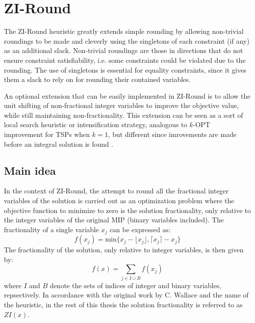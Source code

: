 \documentclass[a4paper,12pt,twoside]{scrbook}
\begin{document}
\section{ZI-Round} \label{sec:ziround}
The ZI-Round heuristic greatly extends simple rounding by allowing non-trivial roundings to be made and cleverly using the singletons of each constraint (if any) as an additional slack. Non-trivial roundings are those in directions that do not ensure constraint satisfiability, i.e. some constraints could be violated due to the rounding. The use of singletons is essential for equality constraints, since it gives them a slack to rely on for rounding their contained variables. \par

An optional extension that can be easily implemented in ZI-Round is to allow the unit shifting of non-fractional integer variables to improve the objective value, while still maintaining non-fractionality. This extension can be seen as a sort of local search heuristic \cite{linker1973} or intensification strategy, analogous to $k$-OPT improvement for TSPs when $k = 1$, but different since imrovements are made before an integral solution is found \cite{wallace2010}. \par

\subsection{Main idea}
In the context of ZI-Round, the attempt to round all the fractional integer variables of the solution is carried out as an optimization problem where the objective function to minimize to zero is the solution fractionality, only relative to the integer variables of the original MIP (binary variables included). The fractionality of a single variable $x_j$ can be expressed as:
\begin{equation}
	f(x_j) = \text{min}\{x_j - \lfloor x_j \rfloor, \lceil x_j \rceil - x_j\}
\end{equation}
The fractionality of the solution, only relative to integer variables, is then given by:
\begin{equation}\label{eq:zi}
	f(x) = \sum_{j \in I \cup B}f(x_j)
\end{equation}
where $I$ and $B$ denote the sets of indices of integer and binary variables, repsectively.
In accordance with the original work by C. Wallace \cite{wallace2010} and the name of the heuristic, in the rest of this thesis the solution fractionality is referred to as $ZI(x)$. \par 
\end{document}
